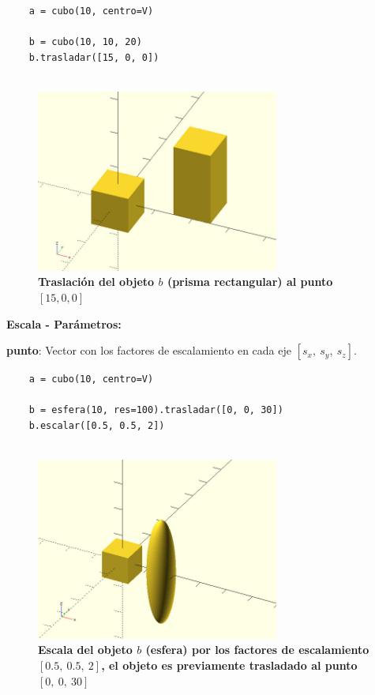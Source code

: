 \begin{verbatim}
    a = cubo(10, centro=V)
    
    b = cubo(10, 10, 20)
    b.trasladar([15, 0, 0]) 
   
\end{verbatim}

\begin{figure}[h]
\includegraphics[width=8cm]{Img/Modelos/modelado11.jpg}
\centering
\caption{\textbf{ \footnotesize{Traslación del objeto $b$ (prisma rectangular) al punto $[15, 0, 0]$}}}
\label{fig:traslacion}
\end{figure}

\begin{description}
\item  \textbf{Escala - Parámetros:}
\item  \textbf{punto}: Vector con los factores de escalamiento en cada eje $[s_x,\ s_y, \ s_z]$.
\end{description}

\begin{verbatim}
    a = cubo(10, centro=V)
    
    b = esfera(10, res=100).trasladar([0, 0, 30])
    b.escalar([0.5, 0.5, 2]) 
   
\end{verbatim}

\begin{figure}[h]
\includegraphics[width=8cm]{Img/Modelos/modelado12.jpg}
\centering
\caption{\textbf{ \footnotesize{Escala del objeto $b$ (esfera) por los factores de escalamiento $[0.5,\ 0.5,\ 2]$, el objeto es previamente trasladado al punto $[0,\ 0,\ 30]$ }}}
\end{figure}

